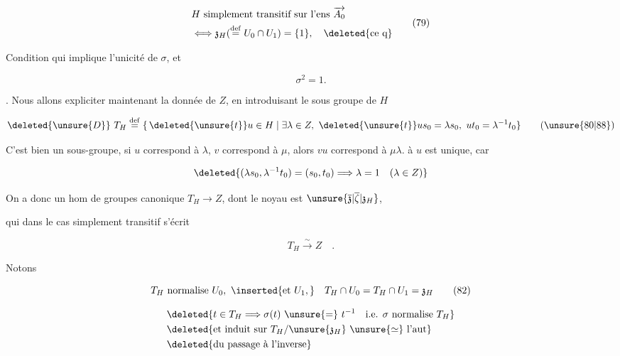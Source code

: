 \[
\begin{aligned}
&H\text{ simplement transitif sur l'ens }\overrightarrow{A_0}\\
&\Longleftrightarrow\mathfrak z_H(\overset{\mathrm{def}}{=}U_0\cap U_1)=\{1\},\quad\deleted{\text{ce q}}
\end{aligned}
\tag*{(79)}
\]

Condition qui implique l'unicité de $\sigma$, et

\[
\sigma^2=1 .
\tag*{(80)}
\]

. Nous allons expliciter maintenant la donnée de $Z$, en introduisant le sous groupe de $H$

\[
\deleted{\unsure{D}}\ T_H\overset{\mathrm{def}}{=}\{\,\deleted{\unsure{t}}u\in H\mid\exists\lambda\in Z,\ \deleted{\unsure{t}}us_0=\lambda s_0,\ ut_0=\lambda^{-1}t_0\}
\tag*{(\unsure{80|88})}
\]

C'est bien un sous-groupe,  si $u$ correspond à $\lambda$, $v$ correspond à $\mu$, alors $vu$ correspond à $\mu\lambda$.  à $u$ est unique, car    

\[
\deleted{(\lambda s_0,\lambda^{-1}t_0)=(s_0,t_0)\Longrightarrow\lambda=1\quad(\lambda\in Z)}
\]

 On a donc un hom de groupes canonique $T_H\longrightarrow Z$, dont le noyau est $\unsure{\overline{\mathfrak z}|\overline\zeta|\mathfrak z_H}$,



qui dans le cas simplement transitif s'écrit

\[
T_H\xrightarrow{\sim}Z\quad .
\tag*{$(81')$}
\]

Notons

\[
T_H\text{ normalise }U_0,\ \inserted{\text{et }U_1,}\quad T_H\cap U_0=T_H\cap U_1=\mathfrak z_H
\tag*{(82)}
\]

\[
\begin{aligned}
&\deleted{t\in T_H\Longrightarrow\sigma(t)\ \unsure{=}\ t^{-1}\quad\text{i.e. }\sigma\text{ normalise }T_H}\\
&\deleted{\text{et induit sur }T_H/\unsure{\mathfrak z_H}\ \unsure{\simeq}\ \text{l'aut}}\\
&\deleted{\text{du passage à l'inverse}}
\end{aligned}
\]

